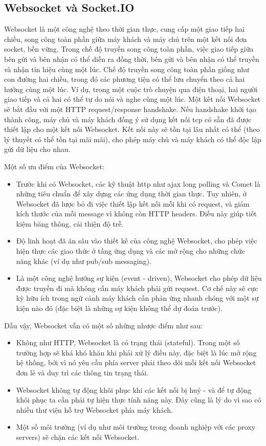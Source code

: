 \subsection{Websocket và Socket.IO}
Websocket là một công nghệ theo thời gian thực, cung cấp một giao tiếp hai
chiều, song công toàn phần giữa máy khách và máy chủ trên một kết nối đơn
socket, bền vững. Trong chế độ truyền song công toàn phần, việc giao tiếp giữa
bên gửi và bên nhận có thể diễn ra đồng thời, bên gửi và bên nhận có thể truyền
và nhận tín hiệu cùng một lúc. Chế độ truyền song công toàn phần giống như con
đường hai chiều, trong đó các phương tiện có thể lưu chuyển theo cả hai hướng
cùng một lúc. Ví dụ, trong một cuộc trò chuyện qua điện thoại, hai người giao
tiếp và cả hai có thể tự do nói và nghe cùng một lúc. Một kết nối Websocket sẽ
bắt đầu với một HTTP request/response handshake. Nếu handshake khởi tạo thành
công, máy chủ và máy khách đồng ý sử dụng kết nối \acrshort*{tcp} có sẵn đã được thiết lập
cho một kết nối Websocket. Kết nối này sẽ tồn tại lâu nhất có thể (theo lý
thuyết có thể tồn tại mãi mãi), cho phép máy chủ và máy khách có thể độc lập
gửi dữ liệu cho nhau.
\par
Một số ưu điểm của Websocket:
\begin{itemize}
    \item Trước khi có Websocket, các kỹ thuật \acrshort*{http} như \acrshort*{ajax} long polling và Comet là
          những tiêu chuẩn để xây dựng các ứng dụng thời gian thực. Tuy nhiên, ở
          Websocket đã lược bỏ đi việc thiết lập kết nối mỗi khi có request, và giảm kích
          thước của mỗi message vì không còn HTTP headers. Điều này giúp tiết kiệm băng
          thông, cải thiện độ trễ.
    \item Độ linh hoạt đã ăn sâu vào thiết kế của công nghệ Websocket, cho phép việc hiện thực các giao thức ở tầng ứng dụng và các mở rộng cho những chức năng khác (ví dụ như pub/sub messaging).
    \item Là một công nghệ hướng sự kiện (event - driven), Websocket cho phép dữ liệu
          được truyền đi mà không cần máy khách phải gửi request. Cơ chế này sẽ cực kỳ
          hữu ích trong ngữ cảnh máy khách cần phản ứng nhanh chóng với một sự kiện nào
          đó (đặc biệt là những sự kiện không thể dự đoán trước).
\end{itemize}
\par
Dẫu vậy, Websocket vẫn có một số những nhược điểm như sau:
\begin{itemize}
    \item Không như HTTP, Websocket là có trạng thái (stateful). Trong một số trường hợp
          sẽ khá khó khăn khi phải xử lý điều này, đặc biệt là lúc mở rộng hệ thống, bởi
          vì nó yêu cầu phía server phải theo dõi mỗi kết nối Websocket đơn lẻ và duy trì
          các thông tin trạng thái.
    \item Websocket không tự động khôi phục khi các kết nối bị huỷ - và để tự động khôi
          phục ta cần phải tự hiện thực tính năng này. Đây cũng là lý do vì sao có nhiều
          thư viện hỗ trợ Websocket phía máy khách.
    \item Một số môi trường (ví dụ như môi trường trong doanh nghiệp với các proxy
          servers) sẽ chặn các kết nối Websocket.
\end{itemize}
